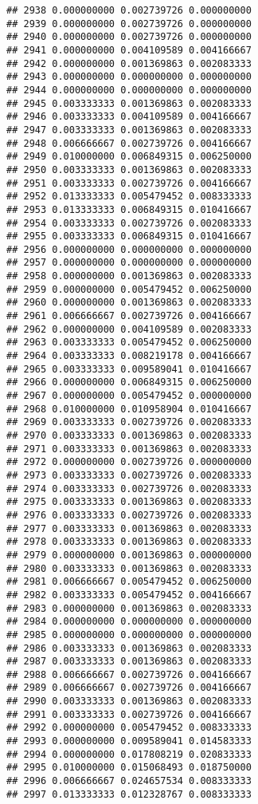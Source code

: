 \documentclass[
]{article}
\begin{document}
\begin{verbatim}
## 2938 0.000000000 0.002739726 0.000000000
## 2939 0.000000000 0.002739726 0.000000000
## 2940 0.000000000 0.002739726 0.000000000
## 2941 0.000000000 0.004109589 0.004166667
## 2942 0.000000000 0.001369863 0.002083333
## 2943 0.000000000 0.000000000 0.000000000
## 2944 0.000000000 0.000000000 0.000000000
## 2945 0.003333333 0.001369863 0.002083333
## 2946 0.003333333 0.004109589 0.004166667
## 2947 0.003333333 0.001369863 0.002083333
## 2948 0.006666667 0.002739726 0.004166667
## 2949 0.010000000 0.006849315 0.006250000
## 2950 0.003333333 0.001369863 0.002083333
## 2951 0.003333333 0.002739726 0.004166667
## 2952 0.013333333 0.005479452 0.008333333
## 2953 0.013333333 0.006849315 0.010416667
## 2954 0.003333333 0.002739726 0.002083333
## 2955 0.003333333 0.006849315 0.010416667
## 2956 0.000000000 0.000000000 0.000000000
## 2957 0.000000000 0.000000000 0.000000000
## 2958 0.000000000 0.001369863 0.002083333
## 2959 0.000000000 0.005479452 0.006250000
## 2960 0.000000000 0.001369863 0.002083333
## 2961 0.006666667 0.002739726 0.004166667
## 2962 0.000000000 0.004109589 0.002083333
## 2963 0.003333333 0.005479452 0.006250000
## 2964 0.003333333 0.008219178 0.004166667
## 2965 0.003333333 0.009589041 0.010416667
## 2966 0.000000000 0.006849315 0.006250000
## 2967 0.000000000 0.005479452 0.000000000
## 2968 0.010000000 0.010958904 0.010416667
## 2969 0.003333333 0.002739726 0.002083333
## 2970 0.003333333 0.001369863 0.002083333
## 2971 0.003333333 0.001369863 0.002083333
## 2972 0.000000000 0.002739726 0.000000000
## 2973 0.003333333 0.002739726 0.002083333
## 2974 0.003333333 0.002739726 0.002083333
## 2975 0.003333333 0.001369863 0.002083333
## 2976 0.003333333 0.002739726 0.002083333
## 2977 0.003333333 0.001369863 0.002083333
## 2978 0.003333333 0.001369863 0.002083333
## 2979 0.000000000 0.001369863 0.000000000
## 2980 0.003333333 0.001369863 0.002083333
## 2981 0.006666667 0.005479452 0.006250000
## 2982 0.003333333 0.005479452 0.004166667
## 2983 0.000000000 0.001369863 0.002083333
## 2984 0.000000000 0.000000000 0.000000000
## 2985 0.000000000 0.000000000 0.000000000
## 2986 0.003333333 0.001369863 0.002083333
## 2987 0.003333333 0.001369863 0.002083333
## 2988 0.006666667 0.002739726 0.004166667
## 2989 0.006666667 0.002739726 0.004166667
## 2990 0.003333333 0.001369863 0.002083333
## 2991 0.003333333 0.002739726 0.004166667
## 2992 0.000000000 0.005479452 0.008333333
## 2993 0.000000000 0.009589041 0.014583333
## 2994 0.000000000 0.017808219 0.020833333
## 2995 0.010000000 0.015068493 0.018750000
## 2996 0.006666667 0.024657534 0.008333333
## 2997 0.013333333 0.012328767 0.008333333

\end{verbatim}
\end{document}
